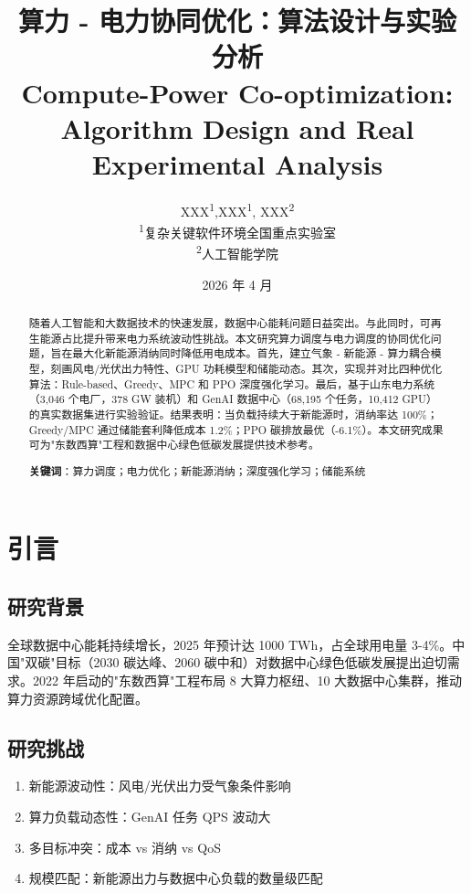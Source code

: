\documentclass[12pt,a4paper]{article}
\title{\textbf{算力 - 电力协同优化：算法设计与实验分析}\\[0.5em]
\large Compute-Power Co-optimization: Algorithm Design and Real Experimental Analysis}
\author{XXX\textsuperscript{1},XXX\textsuperscript{1}, XXX\textsuperscript{2}\\[0.5em]
\textsuperscript{1}复杂关键软件环境全国重点实验室\\
\textsuperscript{2}人工智能学院}
\date{2026 年 4 月}
\begin{document}
\maketitle

\begin{abstract}
随着人工智能和大数据技术的快速发展，数据中心能耗问题日益突出。与此同时，可再生能源占比提升带来电力系统波动性挑战。本文研究算力调度与电力调度的协同优化问题，旨在最大化新能源消纳同时降低用电成本。首先，建立气象 - 新能源 - 算力耦合模型，刻画风电/光伏出力特性、GPU 功耗模型和储能动态。其次，实现并对比四种优化算法：Rule-based、Greedy、MPC 和 PPO 深度强化学习。最后，基于山东电力系统（3,046 个电厂，378 GW 装机）和 GenAI 数据中心（68,195 个任务，10,412 GPU）的真实数据集进行实验验证。结果表明：当负载持续大于新能源时，消纳率达 100\%；Greedy/MPC 通过储能套利降低成本 1.2\%；PPO 碳排放最优（-6.1\%）。本文研究成果可为"东数西算"工程和数据中心绿色低碳发展提供技术参考。

\vspace{1em}
\noindent\textbf{关键词}：算力调度；电力优化；新能源消纳；深度强化学习；储能系统
\end{abstract}

\section{引言}
\label{sec:intro}

\subsection{研究背景}

全球数据中心能耗持续增长，2025 年预计达 1000 TWh，占全球用电量 3-4\%。中国"双碳"目标（2030 碳达峰、2060 碳中和）对数据中心绿色低碳发展提出迫切需求。2022 年启动的"东数西算"工程布局 8 大算力枢纽、10 大数据中心集群，推动算力资源跨域优化配置。

\subsection{研究挑战}

\begin{enumerate}
    \item 新能源波动性：风电/光伏出力受气象条件影响
    \item 算力负载动态性：GenAI 任务 QPS 波动大
    \item 多目标冲突：成本 vs 消纳 vs QoS
    \item 规模匹配：新能源出力与数据中心负载的数量级匹配
\end{enumerate}
\end{document}
